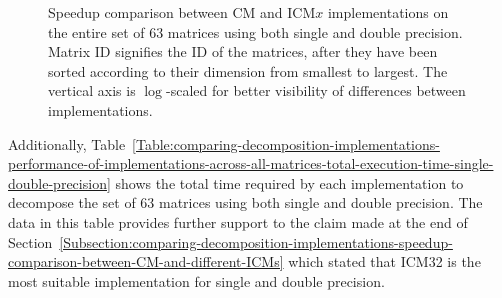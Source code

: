 \begin{figure}[ht!]
\begin{subfigure}{\textwidth}
		\label{Graph:comparing-decomposition-implementations-performance-of-implementations-across-all-matrices-speedup-double-precision}
	\end{subfigure}
	\caption{Speedup comparison between CM and ICM$ x $ implementations on the entire set of 63 matrices using both single and double precision. Matrix ID signifies the ID of the matrices, after they have been sorted according to their dimension from smallest to largest. The vertical axis is $ \log $-scaled for better visibility of differences between implementations.}
	\label{Graph:comparing-decomposition-implementations-performance-of-implementations-across-all-matrices-speedup-single-double-precision}
\end{figure}

Additionally, Table~\ref{Table:comparing-decomposition-implementations-performance-of-implementations-across-all-matrices-total-execution-time-single-double-precision} shows the total time required by each implementation to decompose the set of 63 matrices using both single and double precision. The data in this table provides further support to the claim made at the end of Section~\ref{Subsection:comparing-decomposition-implementations-speedup-comparison-between-CM-and-different-ICMs} which stated that ICM32 is the most suitable implementation for single and double precision.

